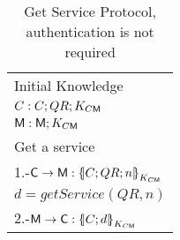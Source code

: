 \begin{table}[htb]
\footnotesize
\begin{center}
\caption{Get Service Protocol, authentication is not required}
\label{table:ProtGetServicesNoAuth}
\begin{tabular}{|l|}
\hline
           Initial Knowledge                                                             \\
            $C:C; QR ;  K_{C\textsf{M}}$                                    \\
            $\textsf{M}: \textsf{M}; K_{C\textsf{M}}$    \\ \hline \hline 
           Get a service                                                                        \\
           1.-$\Client\rightarrow \Server: \fat{C \lnk QR \lnk n}_{K_{C\Server}}$          \\ 
           \hspace{5mm} $d=getService(QR,n)$                                  \\  
           2.-$\Server\rightarrow \Client: \fat{C \lnk d}_{K_{C\Server}}$       \\  \hline \hline
\end{tabular}
\end{center}
\end{table}
\normalsize
